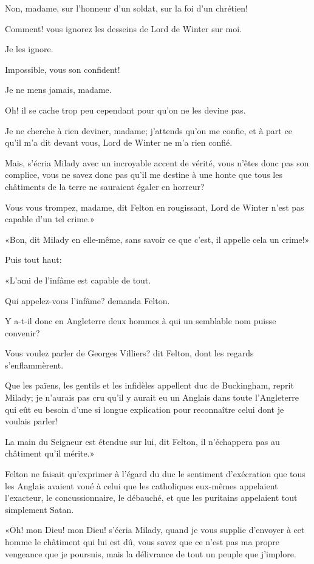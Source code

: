 \speak  Non, madame, sur l'honneur d'un soldat, sur la foi d'un chrétien! 

\speak  Comment! vous ignorez les desseins de Lord de Winter sur moi. 

\speak  Je les ignore. 

\speak  Impossible, vous son confident! 

\speak  Je ne mens jamais, madame. 

\speak  Oh! il se cache trop peu cependant pour qu'on ne les devine pas. 

\speak  Je ne cherche à rien deviner, madame; j'attends qu'on me confie, et à part ce qu'il m'a dit devant vous, Lord de Winter ne m'a rien confié. 

\speak  Mais, s'écria Milady avec un incroyable accent de vérité, vous n'êtes donc pas son complice, vous ne savez donc pas qu'il me destine à une honte que tous les châtiments de la terre ne sauraient égaler en horreur? 

\speak  Vous vous trompez, madame, dit Felton en rougissant, Lord de Winter n'est pas capable d'un tel crime.» 

«Bon, dit Milady en elle-même, sans savoir ce que c'est, il appelle cela un crime!» 

Puis tout haut: 

«L'ami de l'infâme est capable de tout. 

\speak  Qui appelez-vous l'infâme? demanda Felton. 

\speak  Y a-t-il donc en Angleterre deux hommes à qui un semblable nom puisse convenir? 

\speak  Vous voulez parler de Georges Villiers? dit Felton, dont les regards s'enflammèrent. 

\speak  Que les païens, les gentils et les infidèles appellent duc de Buckingham, reprit Milady; je n'aurais pas cru qu'il y aurait eu un Anglais dans toute l'Angleterre qui eût eu besoin d'une si longue explication pour reconnaître celui dont je voulais parler! 

\speak  La main du Seigneur est étendue sur lui, dit Felton, il n'échappera pas au châtiment qu'il mérite.» 

Felton ne faisait qu'exprimer à l'égard du duc le sentiment d'exécration que tous les Anglais avaient voué à celui que les catholiques eux-mêmes appelaient l'exacteur, le concussionnaire, le débauché, et que les puritains appelaient tout simplement Satan. 

«Oh! mon Dieu! mon Dieu! s'écria Milady, quand je vous supplie d'envoyer à cet homme le châtiment qui lui est dû, vous savez que ce n'est pas ma propre vengeance que je poursuis, mais la délivrance de tout un peuple que j'implore. 


